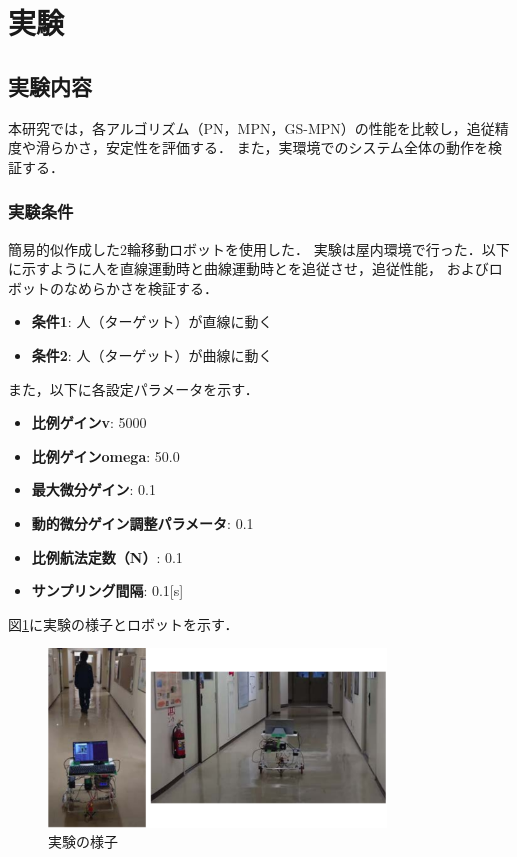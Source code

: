 \section{実験}

\subsection{実験内容}
本研究では，各アルゴリズム（PN，MPN，GS-MPN）の性能を比較し，追従精度や滑らかさ，安定性を評価する．
また，実環境でのシステム全体の動作を検証する．

\subsubsection{実験条件}
簡易的似作成した2輪移動ロボットを使用した．
実験は屋内環境で行った．以下に示すように人を直線運動時と曲線運動時とを追従させ，追従性能，
およびロボットのなめらかさを検証する．
\begin{itemize}
    \item \textbf{条件1}: 人（ターゲット）が直線に動く
    \item \textbf{条件2}: 人（ターゲット）が曲線に動く
\end{itemize}

また，以下に各設定パラメータを示す．

\begin{itemize}
    \item \textbf{比例ゲインv}: 5000
    \item \textbf{比例ゲインomega}: 50.0
    \item \textbf{最大微分ゲイン}: 0.1
    \item \textbf{動的微分ゲイン調整パラメータ}: 0.1
    \item \textbf{比例航法定数（N）}: 0.1
    \item \textbf{サンプリング間隔}: 0.1[s]
\end{itemize}

図\ref{fig:robo}に実験の様子とロボットを示す．

\begin{figure}[H]
    \centering
    \includegraphics[width=0.8\textwidth]{figure/robo.pdf}
    \caption{実験の様子}
    \label{fig:robo}
\end{figure}

